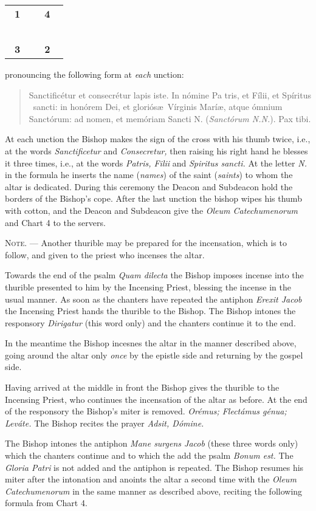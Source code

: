\documentclass[letterpaper]{report}
\newcommand\crossplan{
\begin{center}
    \begin{tabular}{ | l c r | }
       \hline
       \cross\ \textbf{1} &                    & \textbf{4} \cross\ \\
                          &       \cross\      &                    \\
       \cross\ \textbf{3} &                    & \textbf{2} \cross\ \\
       \hline
   \end{tabular} 
\end{center}
}
\begin{document}
{\crossplan

pronouncing the following form at \textit{each} unction:

\begin{quote}
    Sancti\cross ficétur et conse\cross crétur lapis iste. In nómine Pa\cross
    tris, et Fí\cross lii, et Spíritus \cross\ sancti: in honórem Dei, et
    gloriós\ae\ Vírginis Marí\ae, atque ómnium Sanctórum: ad nomen, et memóriam
    Sancti N. (\textit{Sanctórum N.N.}). Pax tibi.
\end{quote}

At each unction the Bishop makes the sign of the cross with his thumb twice,
i.e., at the words \textit{Sanctificetur} and \textit{Consecretur,} then
raising his right hand he blesses it three times, i.e., at the words
\textit{Patris, Filii} and \textit{Spiritus sancti.} At the letter \textit{N.}
in the formula he inserts the name (\textit{names}) of the saint
(\textit{saints}) to whom the altar is dedicated. During this ceremony the
Deacon and Subdeacon hold the borders of the Bishop's cope. After the last
unction the bishop wipes his thumb with cotton, and the Deacon and Subdeacon
give the \textit{Oleum Catechumenorum} and Chart 4 to the servers.

\textsc{Note. ---} Another thurible may be prepared for the incensation, which
is to follow, and given to the priest who incenses the altar.

\rubric Towards the end of the psalm \textit{Quam dilecta} the Bishop imposes
incense into the thurible presented to him by the Incensing Priest, blessing
the incense in the usual manner. As soon as the chanters have repeated the
antiphon \textit{Erexit Jacob} the Incensing Priest hands the thurible to the
Bishop. The Bishop intones the responsory \textit{Dirigatur} (this word only)
and the chanters continue it to the end.

In the meantime the Bishop incesnes the altar in the manner described above,
going around the altar only \textit{once} by the epistle side and returning by
the gospel side.

\rubric Having arrived at the middle in front the Bishop gives the thurible to
the Incensing Priest, who continues the incensation of the altar as before. At
the end of the responsory the Bishop's miter is removed. \textit{Orémus;
Flectámus génua; Leváte.} The Bishop recites the prayer \textit{Adsit, Dómine.}

\rubric The Bishop intones the antiphon \textit{Mane surgens Jacob} (these
three words only) which the chanters continue and to which the add the psalm
\textit{Bonum est.} The \textit{Gloria Patri} is not added and the antiphon is
repeated. The Bishop resumes his miter after the intonation and anoints the
altar a second time with the \textit{Oleum Catechumenorum} in the same manner
as described above, reciting the following formula from Chart 4.

}
\end{document}
